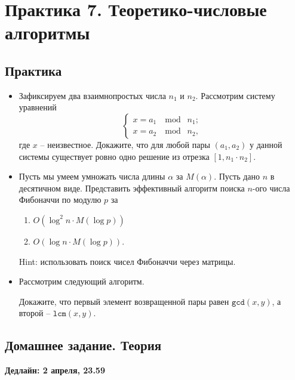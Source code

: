 \section{Практика 7. Теоретико-числовые алгоритмы}

\subsection{Практика}

\begin{itemize}

    \item Зафиксируем два взаимнопростых числа $n_1$ и $n_2$. Рассмотрим систему уравнений
            $$
            \left\{
                \begin{array}{l}
                    x = a_1 \;\mod\; n_1; \\
                    x = a_2 \;\mod\; n_2,
                \end{array}        
            \right.
            $$
        где $x$ -- неизвестное. Докажите, что для любой пары $(a_1, a_2)$ у данной системы существует ровно одно решение из отрезка $[1, n_1 \cdot n_2]$.
        
        
    \item Пусть мы умеем умножать числа длины $\alpha$ за $M(\alpha)$. Пусть дано $n$ в десятичном виде. Представить эффективный алгоритм поиска $n$-ого числа Фибоначчи по модулю $p$ за
    \begin{enumerate}
        \item $O(\log^2 n \cdot M(\log p))$
        \item $O(\log n \cdot M(\log p))$.
    \end{enumerate}
    Hint: использовать поиск чисел Фибоначчи через матрицы.

    \item Рассмотрим следующий алгоритм.
    
    Докажите, что первый элемент возвращенной пары равен $\texttt{gcd}(x, y)$, а второй -- $\texttt{lcm}(x, y)$.    


\end{itemize}

\subsection{Домашнее задание. Теория}
\textbf{Дедлайн: 2 апреля, 23.59}

